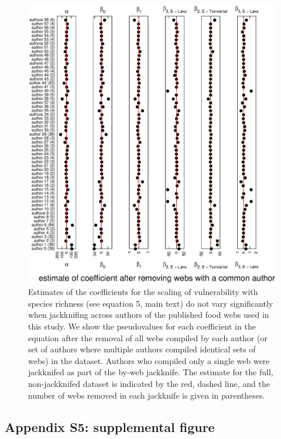 \documentclass[12pt]{article}
\begin{document}
    \begin{figure}[!h]
    \centerline{\includegraphics*[height=.75\textheight]{Figures/Jackknife/Vul_author.eps}}
    \caption{Estimates of the coefficients for the scaling of vulnerability with species richness
    (see equation 5, main text) do not vary significantly
    when jackknifing across authors of the published food webs used in this study. 
    We show the pseudovalues for each coefficient
    in the equation after the removal of all webs compiled by each author (or set of authors where
    multiple authors compiled identical sets of webs) in the dataset. Authors
    who compiled only a single web were jackknifed as part of the by-web jackknife.
    The estimate for the full, non-jackknifed dataset is indicated by the red, dashed line, and
    the number of webs removed in each jackknife is given in parentheses.}
    \label{Vul_auth}
    \end{figure}


\clearpage

\subsection*{Appendix S5: supplemental figure}
\end{document}

